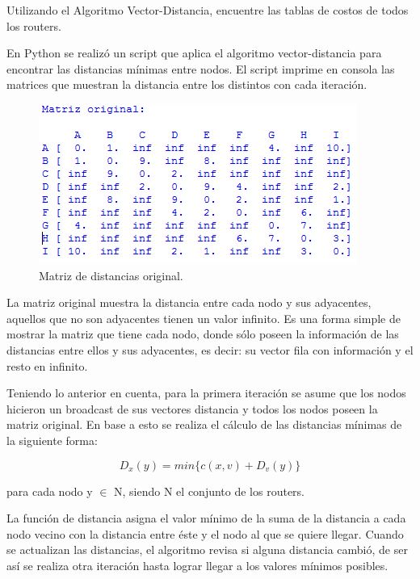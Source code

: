 \documentclass{article}
\begin{document}
Utilizando el Algoritmo Vector-Distancia, encuentre las tablas de costos de todos los routers.

En Python se realizó un script que aplica el algoritmo vector-distancia para encontrar las distancias mínimas entre nodos. El script imprime en consola las matrices que muestran la distancia entre los distintos con cada iteración.

\begin{figure}[H]
    \centering
    \includegraphics[scale=0.7]{original}
    \caption{Matriz de distancias original.}
\end{figure}

La matriz original muestra la distancia entre cada nodo y sus adyacentes, aquellos que no son adyacentes tienen un valor infinito. Es una forma simple de mostrar la matriz que tiene cada nodo, donde sólo poseen la información de las distancias entre ellos y sus adyacentes, es decir: su  vector fila con información y el resto en infinito.

Teniendo lo anterior en cuenta, para la primera iteración se asume que los nodos hicieron un broadcast de sus vectores distancia y todos los nodos poseen la matriz original. En base a esto se realiza el cálculo de las distancias mínimas de la siguiente forma:

\begin{center}
\begin{equation} \label{eq:1}
D_x(y) = min\{c(x,v)+D_v(y)\} 
\end{equation} 
\end{center}
para cada nodo y $\in$ N, siendo N el conjunto de los routers.

La función de distancia asigna el valor mínimo de la suma de la distancia a cada nodo vecino con la distancia entre éste y el nodo al que se quiere llegar. Cuando se actualizan las distancias, el algoritmo revisa si alguna distancia cambió, de ser así se realiza otra iteración hasta lograr llegar a los valores mínimos posibles.
\end{document}

